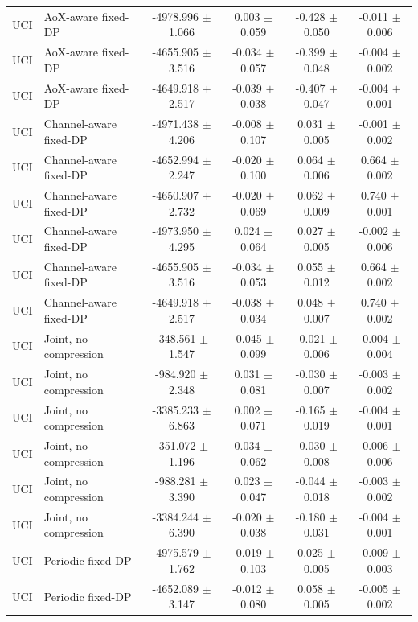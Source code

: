 \begin{tabular}{llcccc}
UCI & AoX-aware fixed-DP & -4978.996 $\pm$ 1.066 & 0.003 $\pm$ 0.059 & -0.428 $\pm$ 0.050 & -0.011 $\pm$ 0.006 \\
UCI & AoX-aware fixed-DP & -4655.905 $\pm$ 3.516 & -0.034 $\pm$ 0.057 & -0.399 $\pm$ 0.048 & -0.004 $\pm$ 0.002 \\
UCI & AoX-aware fixed-DP & -4649.918 $\pm$ 2.517 & -0.039 $\pm$ 0.038 & -0.407 $\pm$ 0.047 & -0.004 $\pm$ 0.001 \\
UCI & Channel-aware fixed-DP & -4971.438 $\pm$ 4.206 & -0.008 $\pm$ 0.107 & 0.031 $\pm$ 0.005 & -0.001 $\pm$ 0.002 \\
UCI & Channel-aware fixed-DP & -4652.994 $\pm$ 2.247 & -0.020 $\pm$ 0.100 & 0.064 $\pm$ 0.006 & 0.664 $\pm$ 0.002 \\
UCI & Channel-aware fixed-DP & -4650.907 $\pm$ 2.732 & -0.020 $\pm$ 0.069 & 0.062 $\pm$ 0.009 & 0.740 $\pm$ 0.001 \\
UCI & Channel-aware fixed-DP & -4973.950 $\pm$ 4.295 & 0.024 $\pm$ 0.064 & 0.027 $\pm$ 0.005 & -0.002 $\pm$ 0.006 \\
UCI & Channel-aware fixed-DP & -4655.905 $\pm$ 3.516 & -0.034 $\pm$ 0.053 & 0.055 $\pm$ 0.012 & 0.664 $\pm$ 0.002 \\
UCI & Channel-aware fixed-DP & -4649.918 $\pm$ 2.517 & -0.038 $\pm$ 0.034 & 0.048 $\pm$ 0.007 & 0.740 $\pm$ 0.002 \\
UCI & Joint, no compression & -348.561 $\pm$ 1.547 & -0.045 $\pm$ 0.099 & -0.021 $\pm$ 0.006 & -0.004 $\pm$ 0.004 \\
UCI & Joint, no compression & -984.920 $\pm$ 2.348 & 0.031 $\pm$ 0.081 & -0.030 $\pm$ 0.007 & -0.003 $\pm$ 0.002 \\
UCI & Joint, no compression & -3385.233 $\pm$ 6.863 & 0.002 $\pm$ 0.071 & -0.165 $\pm$ 0.019 & -0.004 $\pm$ 0.001 \\
UCI & Joint, no compression & -351.072 $\pm$ 1.196 & 0.034 $\pm$ 0.062 & -0.030 $\pm$ 0.008 & -0.006 $\pm$ 0.006 \\
UCI & Joint, no compression & -988.281 $\pm$ 3.390 & 0.023 $\pm$ 0.047 & -0.044 $\pm$ 0.018 & -0.003 $\pm$ 0.002 \\
UCI & Joint, no compression & -3384.244 $\pm$ 6.390 & -0.020 $\pm$ 0.038 & -0.180 $\pm$ 0.031 & -0.004 $\pm$ 0.001 \\
UCI & Periodic fixed-DP & -4975.579 $\pm$ 1.762 & -0.019 $\pm$ 0.103 & 0.025 $\pm$ 0.005 & -0.009 $\pm$ 0.003 \\
UCI & Periodic fixed-DP & -4652.089 $\pm$ 3.147 & -0.012 $\pm$ 0.080 & 0.058 $\pm$ 0.005 & -0.005 $\pm$ 0.002 \\

\end{tabular}
